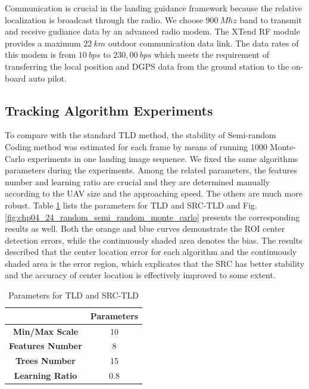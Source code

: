 Communication is crucial in the landing guidance framework because the relative localization is broadcast through the radio. We choose $900\ Mhz$ band to transmit and receive gudiance data by an advanced radio modem. The XTend RF module provides a maximum $22\ km$ outdoor communication data link. The data rates of this modem is from $10\ bps$ to $230,00\ bps$ which meets the requirement of transferring the local position and DGPS data from the ground station to the on-board auto pilot. 
 
\subsection{Tracking Algorithm Experiments}
To compare with the standard TLD method, the stability of Semi-random Coding method was estimated for each frame by means of running 1000 Monte-Carlo experiments in one landing image sequence. We fixed the same algorithms parameters during the experiments. Among the related parameters, the features number and learning ratio are crucial and they are determined manually according to the UAV size and the approaching speed. The others are much more robust. Table \ref{lab:TLD_params} lists the parameters for TLD and SRC-TLD and Fig.\ref{fig:chp04_24_random_semi_random_monte_carlo} presents the corresponding results as well. Both the orange and blue curves demonstrate the ROI center detection errors, while the continuously shaded area denotes the bias. The results described that the center location error for each algorithm and the continuously shaded area is the error region, which explicates that the SRC has better stability and the accuracy of center location is effectively improved to some extent. 

\begin{table}[!th]
	\centering
	\caption{Parameters for TLD and SRC-TLD}
	\label{lab:TLD_params}
	\begin{tabular}{cc}
		\hline
		& \textbf{Parameters} \\ \hline
		\textbf{Min/Max Scale} & 10 \\
		\textbf{Features Number} & 8 \\
		\textbf{Trees Number} & 15 \\
		\textbf{Learning Ratio} & 0.8 \\ \hline
	\end{tabular}
\end{table}

